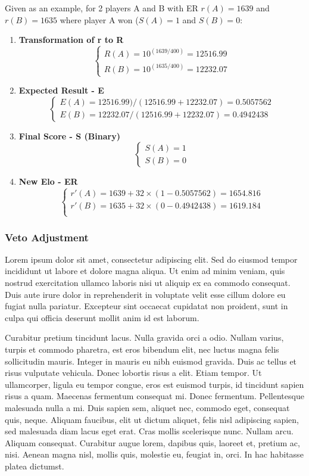 Given as an example, for 2 players A and B with ER $r(A) = 1639$ and $r(B) = 1635$ where player A won ($S(A)=1$ and $S(B) = 0$:
\begin{enumerate}
\item \textbf{Transformation of r to R} $$ \begin{cases}
        R(A) = 10^{(1639/400)} = 12516.99 \\ 
        R(B) = 10^{(1635/400)} = 12232.07
    \end{cases} $$
    \item \textbf{Expected Result - E} $$
    \begin{cases}
        E(A) = 12516.99)/(12516.99+12232.07) = 0.5057562 \\
        E(B) = 12232.07/(12516.99+12232.07) = 0.4942438
    \end{cases} $$
    \item \textbf{Final Score - S (Binary)} $$ 
    \begin{cases}
        S(A) = 1 \\
        S(B) = 0
    \end{cases} $$
    \item \textbf{New Elo - ER} $$
    \begin{cases}
        r'(A) = 1639 + 32 \times (1-0.5057562) = 1654.816 \\
        r'(B) = 1635 + 32 \times (0-0.4942438) = 1619.184 \\
    \end{cases} $$
\end{enumerate}

\subsubsection{Veto Adjustment}

Lorem ipsum dolor sit amet, consectetur adipiscing elit. Sed do eiusmod tempor incididunt ut labore et dolore magna aliqua. Ut enim ad minim veniam, quis nostrud exercitation ullamco laboris nisi ut aliquip ex ea commodo consequat. Duis aute irure dolor in reprehenderit in voluptate velit esse cillum dolore eu fugiat nulla pariatur. Excepteur sint occaecat cupidatat non proident, sunt in culpa qui officia deserunt mollit anim id est laborum.

Curabitur pretium tincidunt lacus. Nulla gravida orci a odio. Nullam varius, turpis et commodo pharetra, est eros bibendum elit, nec luctus magna felis sollicitudin mauris. Integer in mauris eu nibh euismod gravida. Duis ac tellus et risus vulputate vehicula. Donec lobortis risus a elit. Etiam tempor. Ut ullamcorper, ligula eu tempor congue, eros est euismod turpis, id tincidunt sapien risus a quam. Maecenas fermentum consequat mi. Donec fermentum. Pellentesque malesuada nulla a mi. Duis sapien sem, aliquet nec, commodo eget, consequat quis, neque. Aliquam faucibus, elit ut dictum aliquet, felis nisl adipiscing sapien, sed malesuada diam lacus eget erat. Cras mollis scelerisque nunc. Nullam arcu. Aliquam consequat. Curabitur augue lorem, dapibus quis, laoreet et, pretium ac, nisi. Aenean magna nisl, mollis quis, molestie eu, feugiat in, orci. In hac habitasse platea dictumst.
